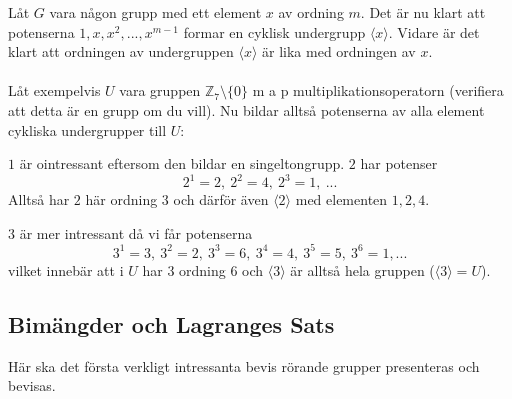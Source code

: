 \documentclass{article}
\begin{document}
Låt $G$ vara någon grupp med ett element $x$ av ordning $m$. Det är nu klart att potenserna $1,x,x^2,...,x^{m-1}$ formar en cyklisk undergrupp $\langle x\rangle$. Vidare är det klart att ordningen av undergruppen $\langle x\rangle$ är lika med ordningen av $x$.\\ \\
Låt exempelvis $U$ vara gruppen $\mathbb{Z}_7\setminus\{0\}$  m a p multiplikationsoperatorn (verifiera att detta är en grupp om du vill). Nu bildar alltså potenserna av alla element cykliska undergrupper till $U$:

$1$ är ointressant eftersom den bildar en singeltongrupp. $2$ har potenser 
$$
2^1=2, \ 2^2=4, \ 2^3=1, \ ...
$$ 
Alltså har $2$ här ordning $3$ och därför även $\langle2\rangle$ med elementen $1,2,4$.

$3$ är mer intressant då vi får potenserna
$$
3^1=3, \ 3^2=2, \ 3^3=6, \ 3^4=4, \ 3^5=5, \ 3^6=1, ...
$$
vilket innebär att i $U$ har $3$ ordning $6$ och $\langle 3\rangle$ är alltså hela gruppen ($\langle3\rangle=U$).
\subsection{Bimängder och Lagranges Sats}
Här ska det första verkligt intressanta bevis rörande grupper presenteras och bevisas. 
\end{document}
